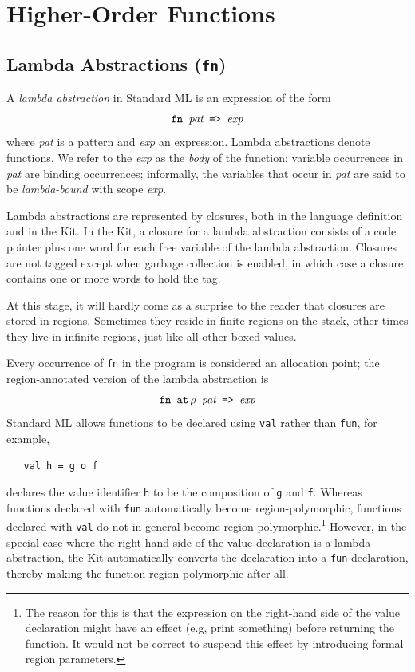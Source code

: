 \documentclass[12pt]{book}
\begin{document}
\chapter{Higher-Order Functions}
\label{hof.sec}

\section{Lambda Abstractions ({\tt fn})}
A {\em lambda abstraction\/} 
%
%
in Standard ML is an expression of the form
$$\hbox{\tt fn {\it pat} => {\it exp}}$$
where {\it pat\/} is a pattern
and {\it exp\/} an expression.  Lambda abstractions denote functions.
We refer to the {\it exp\/} as the {\em body\/} of the function;
variable occurrences in {\it pat\/} are binding occurrences;
informally, the variables that occur in {\it pat\/} are said to be
%
{\em lambda-bound\/} with scope {\it exp}.

Lambda abstractions are represented by closures, both in the language
definition and in the Kit. In the Kit, a closure for a lambda
abstraction consists of a code pointer plus one word for each free
variable of the lambda abstraction. Closures are not tagged except
when garbage collection is enabled, in which case a closure contains
one or more words to hold the tag.

At this stage, it will hardly come as a surprise to the reader that
closures are stored in regions.  Sometimes they reside in finite
regions on the stack, other times they live in infinite regions, just
like all other boxed values.

Every occurrence of {\tt fn} 
%
in the program is considered an allocation point; the region-annotated
version of the lambda abstraction is
$$\hbox{\tt fn $\mathbin{\hbox{\tt at}}\,\rho$ {\it pat} => {\it exp}}$$
Standard ML allows
functions to be declared using {\tt val} rather than {\tt fun}, for
example,
\begin{verbatim}
   val h = g o f
\end{verbatim}
declares the value identifier {\tt h} to be the composition of {\tt g}
and {\tt f}.  Whereas functions declared with
%
{\tt fun} automatically become region-polymorphic, functions
declared with 
%
{\tt val} do not in general become
%
region-polymorphic.\footnote{The reason for this is that the
  expression on the right-hand side of the value declaration might
  have an effect (e.g, print something) before returning the function.
  It would not be correct to suspend this effect by introducing formal
  region parameters.} However, in the special case where the
right-hand side of the value declaration is a
%
lambda abstraction, the Kit automatically converts the declaration
into a {\tt fun} declaration, thereby making the function
region-polymorphic after all.
\end{document}
